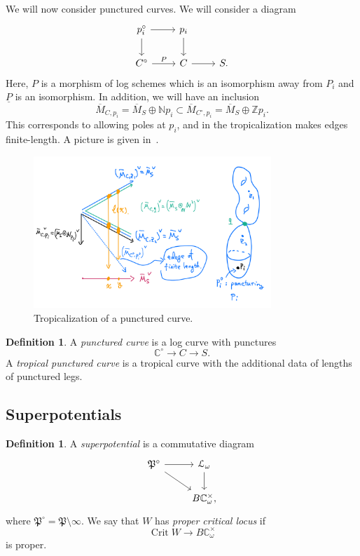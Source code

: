 \documentclass[10pt]{amsart}
\theoremstyle{definition}
\newtheorem{defn}[thm]{Definition}
\theoremstyle{remark}
\theoremstyle{plain}
\theoremstyle{definition}
\theoremstyle{remark}
\newcommand{\N}{\mathbb{N}}
\newcommand{\C}{\mathbb{C}}
\newcommand{\Z}{\mathbb{Z}}
\newcommand{\mc}[1]{\mathcal{#1}}
\newcommand{\mf}[1]{\mathfrak{#1}}
\newcommand{\on}[1]{\operatorname{#1}}
\newcommand{\ol}[1]{\overline{#1}}
\newcommand{\ul}[1]{\underline{#1}}
\newcommand{\1}{\mathbf{1}}
\newcommand{\2}{\mathbf{2}}
\newcommand{\3}{\mathbf{3}}
\begin{document}
We will now consider punctured curves. We will consider a diagram
\begin{equation*}
\begin{tikzcd}
    p_i^{\circ} \ar{r} \ar{d} & p_i \ar{d} \\
    C^{\circ} \ar{r}{P} & C \ar{r} & S.
\end{tikzcd}
\end{equation*}
Here, $P$ is a morphism of log schemes which is an isomorphism away from $P_i$ and $\ul{P}$ is an isomorphism. In addition, we will have an inclusion
\[ \ol{M}_{C,p_i} = \ol{M}_S \oplus \N p_i \subset \ol{M}_{C^{\circ}, p_i} = \ol{M}_S \oplus \Z p_i. \]
This corresponds to allowing poles at $p_i$, and in the tropicalization makes edges finite-length. A picture is given in~.
\begin{figure}[htpb]
    \centering
    \includegraphics[width=0.8\textwidth]{punctured.png}
    \caption{Tropicalization of a punctured curve.}
    \label{fig:punctured-png}
\end{figure}

\begin{defn}
    A \textit{punctured curve} is a log curve with punctures
    \[ \C^{\circ} \to C \to S. \]
    A \textit{tropical punctured curve} is a tropical curve with the additional data of lengths of punctured legs.
\end{defn}

\subsection{Superpotentials}%
\label{sub:Superpotentials}

\begin{defn}
    A \textit{superpotential} is a commutative diagram
    \begin{equation*}
    \begin{tikzcd}
        \mf{P}^{\circ} \ar{r} \ar{dr} & \mc{L}_{\omega} \ar{d} \\
        & B \C^{\times}_{\omega},
    \end{tikzcd}
    \end{equation*}
    where $\mf{P}^{\circ} = \mf{P} \setminus \infty$. We say that $W$ has \textit{proper critical locus} if
    \[ \on{Crit} W \to B \C_{\omega}^{\times} \]
    is proper.
\end{defn}
\end{document}
